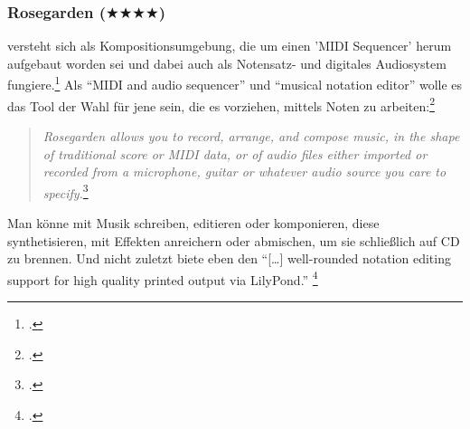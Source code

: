 %
%
%



\subsubsection{Rosegarden ($\bigstar\bigstar\bigstar\bigstar$)}

\label{Rosegarden} versteht sich als Kompositionsumgebung, die
um einen 'MIDI Sequencer' herum aufgebaut worden sei und dabei auch als
Notensatz- und digitales Audiosystem fungiere.\footcite[vgl.][\nopage
wp]{Rosegarden2019a} Als \enquote{MIDI and audio sequencer} und \enquote{musical
notation editor} wolle es das Tool der Wahl für jene sein, die es vorziehen,
mittels Noten zu arbeiten:\footcite[vgl.][\nopage wp]{Rosegarden2019c}

\begin{quote}\textit{Rosegarden allows you to record, arrange, and compose
music, in the shape of traditional score or MIDI data, or of audio files either
imported or recorded from a microphone, guitar or whatever audio source you care
to specify.}\footcite[vgl.][\nopage wp]{Rosegarden2019c} \end{quote}

Man könne mit  Musik schreiben, editieren oder komponieren,
diese synthetisieren, mit Effekten anreichern oder abmischen, um sie schließlich
auf CD zu brennen. Und nicht zuletzt biete  eben den
\enquote{[\ldots] well-rounded notation editing support for high quality printed
output via LilyPond.} \footcite[vgl.][\nopage wp]{Rosegarden2019c}


